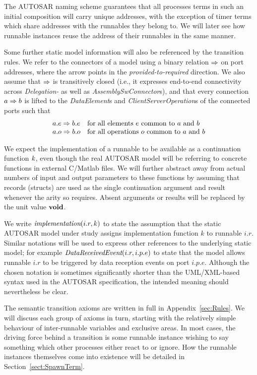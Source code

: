 \documentclass[twocolumn]{article}
\begin{document}
The AUTOSAR naming scheme guarantees that all processes terms in such an initial composition will carry unique addresses, with the exception of timer terms which share addresses with the runnables they belong to. We will later see how runnable instances reuse the address of their runnables in the same manner.

Some further static model information will also be referenced by the transition rules. We refer to the connectors of a model using a binary relation $ \Rightarrow $ on port addresses, where the arrow points in the \emph{provided-to-required} direction. We also assume that $ \Rightarrow $ is transitively closed (i.e., it expresses end-to-end connectivity across \emph{Delegation-} as well as \emph{AssemblySwConnector}s), and that every connection $a \Rightarrow b$ is lifted to the \emph{DataElement}s and \emph{ClientServerOperation}s of the connected ports such that
\[
\begin{array}{lll}
  a.e \Rightarrow b.e & \text{for all elements $e$ common to $a$ and $b$} \\
  a.o \Rightarrow b.o & \text{for all operations $o$ common to $a$ and $b$} \\
\end{array}
\]

We expect the implementation of a runnable to be available as a continuation function $\Cont$, even though the real AUTOSAR model will be referring to concrete functions in external C/Matlab files. We will further abstract away from actual numbers of input and output parameters to these functions by assuming that records (structs) are used as the single continuation argument and result whenever the arity so requires. Absent arguments or results will be replaced by the unit value $\textbf{void}$.

We write $\emph{implementation}(i.r,k)$ to state the assumption that the static AUTOSAR model under study assigns implementation function $k$ to runnable $i.r$. Similar notations will be used to express other references to the underlying static model; for example $\emph{DataReceivedEvent}(i.r,i.p.e)$ to state that the model allows runnable $i.r$ to be triggered by data reception events on port $i.p.e$. Although the chosen notation is sometimes significantly shorter than the UML/XML-based syntax used in the AUTOSAR specification, the intended meaning should nevertheless be clear.

The semantic transition axioms are written in full in Appendix~\ref{sec:Rules}. We will discuss each group of axioms in turn, starting with the relatively simple behaviour of inter-runnable variables and exclusive areas. In most cases, the driving force behind a transition is some runnable instance wishing to say something which other processes either react to or ignore. How the runnable instances themselves come into existence will be detailed in Section~\ref{sect:SpawnTerm}.
\end{document}
